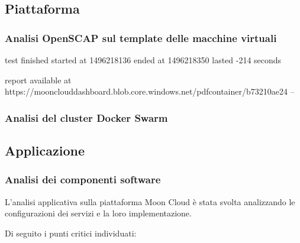 \documentclass[../main.tex]{subfiles}
\begin{document}
\subsection{Piattaforma}
\subsubsection{Analisi OpenSCAP sul template delle macchine virtuali}
test finished
started at 1496218136
ended at 1496218350
lasted -214 seconds

report available at
https://moonclouddashboard.blob.core.windows.net/pdfcontainer/b73210ae24
--

\subsubsection{Analisi del cluster Docker Swarm}

\subsection{Applicazione}
\subsubsection{Analisi dei componenti software}

L'analisi applicativa sulla piattaforma Moon Cloud è stata svolta analizzando le configurazioni dei servizi e la loro implementazione.


Di seguito i punti critici individuati:
\begin{itemize}
\end{itemize}
\end{document}
